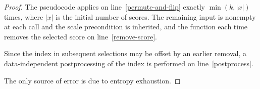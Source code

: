 \documentclass{article}
\begin{document}
\begin{proof}
    The pseudocode applies  on line~\ref{permute-and-flip}
    exactly $\min(k, |x|)$ times, where $|x|$ is the initial number of scores.
    The remaining input is nonempty at each call and the scale precondition is inherited,
    and the function each time removes the selected score on line~\ref{remove-score}.

    Since the index in subsequent selections may be offset by an earlier removal,
    a data-independent postprocessing of the index is performed on line~\ref{postprocess}.

    The only source of error is due to entropy exhaustion.
\end{proof}
\end{document}
